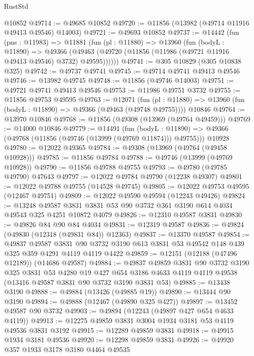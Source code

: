 \begin{lexlean}{RustStd}
\begin{coremodule}
    @10852
@49714 := @49685 @10852
@49720 := @11856 (@13982 (@49714 @11916 @49413 @49546) @14003)
@49721 := @49693 @10852
@49737 := @14442
    (fun (pns : @11983) =>
    @11881
      (fun (pl : @11880) =>
      @13960
        (fun (bodyL : @11890) =>
        @49366 (@49463 (@49720 (@11856 (@11986 (@49721 @11916 @49413 @49546) @3732) @49595))))))
@49741 := @305 @10829 (@305 @10838 @325)
@49742 := @49737 @49741
@49745 := @49714 @49741 @49413 @49546
@49746 := @13982 @49745
@49748 := @11856 (@49746 @14003)
@49751 := @49721 @49741 @49413 @49546
@49753 := @11986 @49751 @3732
@49755 := @11856 @49753 @49595
@49763 := @12071
    (fun (pl : @11880) => @13960 (fun (bodyL : @11890) => @49366 (@49463 (@49748 @49755))))
    @10846
@49764 := @13970 @10846
@49768 := @11856 (@49308 (@13969 (@49764 @49459)))
@49769 := @14000 @10846
@49779 := @14491
    (fun (bodyL : @11890) => @49366 (@49768 (@11856 (@49746 (@13999 (@49769 @11874))) @49755)))
    @10928
@49780 := @12022 @49365
@49784 := @49308 (@13969 (@49764 (@49458 @10928)))
@49785 := @11856 @49784
@49788 := @49746 (@13999 (@49769 @10928))
@49790 := @11856 @49788 @49755
@49793 := @49780 (@49785 @49790) @47643
@49797 := @12022 @49784 @49790 (@12238 @49307)
@49801 := @12022 @49788 @49755 (@14528 @49745)
@49805 := @12022 @49753 @49595 (@12467 @49751)
@49809 := @12022 @49590 @49594 (@12243 @49426)
@49824 := @13248
    @49587
    @3831
    @3831
    @53
    @90
    @3732
    @361
    @3190
    @614
    @4034
    @49543
    @325
    @4251
    @10872
    @4079
@49826 := @12310 @49587 @3831
@49830 := @49826 @84 @90 @84 @4034
@49831 := @12319 @49587
@49836 := @49824 (@49830 (@12318 (@49831 @84)) @12363)
@49837 := @13370 @49587
@49854 := @49837
    @49587
    @3831
    @90
    @3732
    @3190
    @613
    @3831
    @53
    @49542
    @148
    @439
    @325
    @359
    @4291
    @4119
    @4119
    @4422
@49859 := @12151 (@12188 (@47496 @12189)) (@14686 @49587)
@49884 := @49837
    @49859
    @3831
    @90
    @3732
    @3190
    @325
    @3831
    @53
    @4280
    @19
    @427
    @654
    @3186
    @4633
    @4119
    @4119
    @49538
    (@13416 @49587 @3831 @90 @3732 @3190 @3831 @53)
@49885 := @13438 @3190
@49888 := @49884 (@13426 (@49885 @19))
@49890 := @13444 @90 @3190
@49894 := @49888 (@12467 (@49890 @325 @427))
@49897 := @13452 @49587 @90 @3732
@49903 := @49894 (@12243 (@49897 @427 @654 @4633 @4119))
@49913 := @12275 @49859 @3831 @3004 @1934 @3181 @53 @4119 @49536 @3831 @3192
@49915 := @12289 @49859 @3831
@49918 := @49915 @1934 @3181 @49536
@49920 := @12298 @49859 @3831
@49926 := @49920 @357 @1933 @3178 @3180 @4464 @49535

\end{coremodule}
\end{lexlean}
